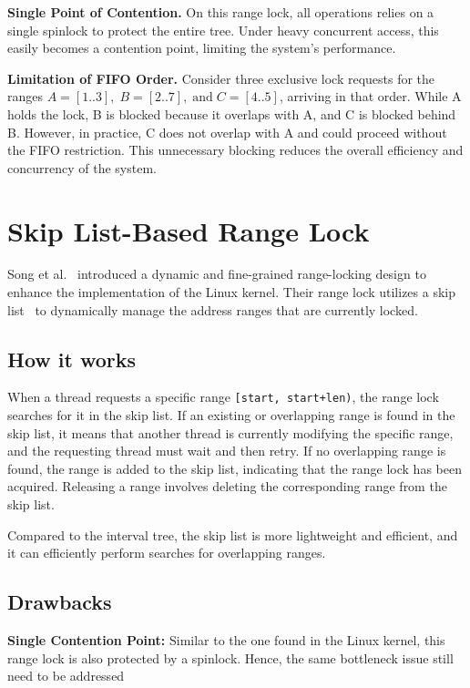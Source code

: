 \textbf{Single Point of Contention.}
On this range lock, all operations relies on a single spinlock to protect the entire tree. 
Under heavy concurrent access, this easily becomes a contention point, limiting the system's performance.
    
\textbf{Limitation of FIFO Order.} 
Consider three exclusive lock requests for the ranges \( A = [1..3], \; B = [2..7], \; \text{and} \; C = [4..5] \), arriving in that order. While A holds the lock, B is blocked because it overlaps with A, and C is blocked behind B. 
However, in practice, C does not overlap with A and could proceed without the FIFO restriction. 
This unnecessary blocking reduces the overall efficiency and concurrency of the system.

\section{Skip List-Based Range Lock}

Song et al.~\parencite{song2013parallelizing} introduced a dynamic and fine-grained range-locking design to enhance the implementation of the Linux kernel. 
Their range lock utilizes a skip list~\parencite{pugh1990skip} to dynamically manage the address ranges that are currently locked.

\subsection*{How it works}

When a thread requests a specific range \texttt{[start, start+len)}, the range lock searches for it in the skip list. 
If an existing or overlapping range is found in the skip list, it means that another thread is currently modifying the specific range, and the requesting thread must wait and then retry. 
If no overlapping range is found, the range is added to the skip list, indicating that the range lock has been acquired. Releasing a range involves deleting the corresponding range from the skip list.

Compared to the interval tree, the skip list is more lightweight and efficient, and it can efficiently perform searches for overlapping ranges.

\subsection*{Drawbacks}

\textbf{Single Contention Point:} 
Similar to the one found in the Linux kernel, this range lock is also protected by a spinlock. Hence, the same bottleneck issue still need to be addressed  

